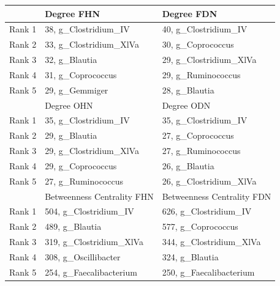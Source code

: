 \begin{table}[!hbtp]
\centering
\begin{tabular}{rll}
  \toprule
 & Degree FHN & Degree FDN \\ 
  \midrule
Rank 1 & 38,  g\_Clostridium\_IV & 40,  g\_Clostridium\_IV \\ 
  Rank 2 & 33,  g\_Clostridium\_XlVa & 30,  g\_Coprococcus \\ 
  Rank 3 & 32,  g\_Blautia & 29,  g\_Clostridium\_XlVa \\ 
  Rank 4 & 31,  g\_Coprococcus & 29,  g\_Ruminococcus \\ 
  Rank 5 & 29,  g\_Gemmiger & 28,  g\_Blautia \\ 
  \midrule

 & Degree OHN & Degree ODN \\ 
  \midrule
Rank 1 & 35,  g\_Clostridium\_IV & 35,  g\_Clostridium\_IV \\ 
  Rank 2 & 29,  g\_Blautia & 27,  g\_Coprococcus \\ 
  Rank 3 & 29,  g\_Clostridium\_XlVa & 27,  g\_Ruminococcus \\ 
  Rank 4 & 29,  g\_Coprococcus & 26,  g\_Blautia \\ 
  Rank 5 & 27,  g\_Ruminococcus & 26,  g\_Clostridium\_XlVa \\ 
\bottomrule \toprule
 & Betweenness Centrality FHN & Betweenness Centrality FDN \\ 
  \midrule
Rank 1 & 504,  g\_Clostridium\_IV & 626,  g\_Clostridium\_IV \\ 
  Rank 2 & 489,  g\_Blautia & 577,  g\_Coprococcus \\ 
  Rank 3 & 319,  g\_Clostridium\_XlVa & 344,  g\_Clostridium\_XlVa \\ 
  Rank 4 & 308,  g\_Oscillibacter & 324,  g\_Blautia \\ 
  Rank 5 & 254,  g\_Faecalibacterium & 250,  g\_Faecalibacterium \\ 
  \midrule
  

\end{tabular}
\end{table}
